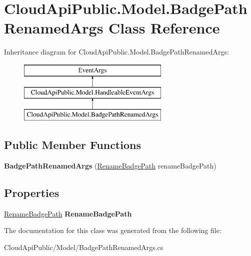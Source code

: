 \hypertarget{class_cloud_api_public_1_1_model_1_1_badge_path_renamed_args}{\section{Cloud\-Api\-Public.\-Model.\-Badge\-Path\-Renamed\-Args Class Reference}
\label{class_cloud_api_public_1_1_model_1_1_badge_path_renamed_args}
}
Inheritance diagram for Cloud\-Api\-Public.\-Model.\-Badge\-Path\-Renamed\-Args\-:\begin{figure}[H]
\begin{center}
\leavevmode
\includegraphics[height=3.000000cm]{class_cloud_api_public_1_1_model_1_1_badge_path_renamed_args}
\end{center}
\end{figure}
\subsection*{Public Member Functions}
\begin{DoxyCompactItemize}
\item 
\hypertarget{class_cloud_api_public_1_1_model_1_1_badge_path_renamed_args_a6a58e84226139a6f792293e77a7d7b66}{{\bfseries Badge\-Path\-Renamed\-Args} (\hyperlink{struct_cloud_api_public_1_1_model_1_1_rename_badge_path}{Rename\-Badge\-Path} rename\-Badge\-Path)}\label{class_cloud_api_public_1_1_model_1_1_badge_path_renamed_args_a6a58e84226139a6f792293e77a7d7b66}

\end{DoxyCompactItemize}
\subsection*{Properties}
\begin{DoxyCompactItemize}
\item 
\hypertarget{class_cloud_api_public_1_1_model_1_1_badge_path_renamed_args_a04a72e66faed2cc7d99ea006c6a93412}{\hyperlink{struct_cloud_api_public_1_1_model_1_1_rename_badge_path}{Rename\-Badge\-Path} {\bfseries Rename\-Badge\-Path}}\label{class_cloud_api_public_1_1_model_1_1_badge_path_renamed_args_a04a72e66faed2cc7d99ea006c6a93412}

\end{DoxyCompactItemize}


The documentation for this class was generated from the following file\-:\begin{DoxyCompactItemize}
\item 
Cloud\-Api\-Public/\-Model/Badge\-Path\-Renamed\-Args.\-cs\end{DoxyCompactItemize}
